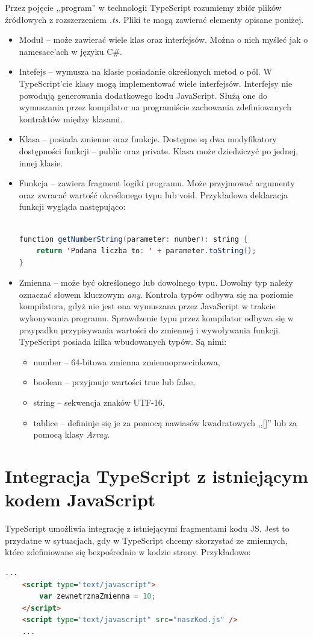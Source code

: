 Przez pojęcie ,,program'' w technologii TypeScript rozumiemy zbiór plików źródłowych z rozszerzeniem \textit{.ts}. Pliki te mogą zawierać elementy opisane poniżej.
\begin{itemize}
\item Moduł -- może zawierać wiele klas oraz interfejsów. Można o nich myśleć jak o namesace'ach w języku C\#.
\item Intefejs -- wymusza na klasie posiadanie określonych metod o pól. W TypeScript'cie klasy mogą implementować wiele interfejsów. Interfejsy nie powodują generowania dodatkowego kodu JavaScript. Służą one do wymuszania przez kompilator na programiście zachowania zdefiniowanych kontraktów między klasami.
\item Klasa -- posiada zmienne oraz funkcje. Dostępne są dwa modyfikatory dostępności funkcji -- public oraz private. Klasa może dziedziczyć po jednej, innej klasie.
\item Funkcja -- zawiera fragment logiki programu. Może przyjmować argumenty oraz zwracać wartość określonego typu lub void. Przykładowa deklaracja funkcji wygląda następująco:\\\\


\begin{lstlisting}[language=Java]
function getNumberString(parameter: number): string {
	return 'Podana liczba to: ' + parameter.toString();
}
\end{lstlisting}
\item Zmienna -- może być określonego lub dowolnego typu. Dowolny typ należy oznaczać słowem kluczowym \textit{any}. Kontrola typów odbywa się na poziomie kompilatora, gdyż nie jest ona wymuszana przez JavaScript w trakcie wykonywania programu. Sprawdzenie typu przez kompilator odbywa się w przypadku przypisywania wartości do zmiennej i wywoływania funkcji. TypeScript posiada kilka wbudowanych typów. Są nimi:
	\begin{itemize}
		\item number -- 64-bitowa zmienna zmiennoprzecinkowa,
		\item boolean -- przyjmuje wartości true lub false,
		\item string -- sekwencja znaków UTF-16,
		\item tablice -- definiuje się je za pomocą nawiasów kwadratowych ,,[]'' lub za pomocą klasy \textit{Array}.
	\end{itemize}
\end{itemize}

\section{Integracja TypeScript z istniejącym kodem JavaScript}
TypeScript umożliwia integrację z istniejącymi fragmentami kodu JS. Jest to przydatne w sytuacjach, gdy w TypeScript chcemy skorzystać ze zmiennych, które zdefiniowane się bezpośrednio w kodzie strony. Przykładowo:
\begin{lstlisting}[language=HTML]
	...
	<script type="text/javascript">
		var zewnetrznaZmienna = 10;
	</script>
	<script type="text/javascript" src="naszKod.js" />
	...
\end{lstlisting}

